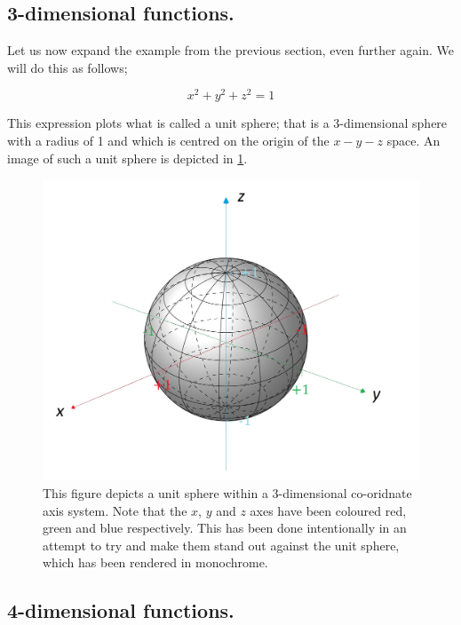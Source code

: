 \documentclass{article}
\begin{document}
\subsection{3-dimensional functions.}

Let us now expand the example from the previous section, even further again. We will do this as follows;

\begin{equation}
x^{2} + y^{2} + z^{2} = 1
\end{equation}

This expression plots what is called a unit sphere; that is a 3-dimensional sphere with a radius of 1 and
which is centred on the origin of the $x-y-z$ space. An image of such a unit sphere is depicted in
\ref{fig:Unit_sphere}.

% 

\begin{figure}
  \begin{center}
  \includegraphics[scale=0.5]{images/Sphere_with_x_y_z_axes.png}
  \end{center}
  \caption{This figure depicts a unit sphere within a 3-dimensional co-oridnate axis system. Note that the $x$, $y$
           and $z$ axes have been coloured red, green and blue respectively. This has been done intentionally in an
           attempt to try and make them stand out against the unit sphere, which has been rendered in monochrome.}
  \label{fig:Unit_sphere}
\end{figure}


\subsection{4-dimensional functions.}
\end{document}
